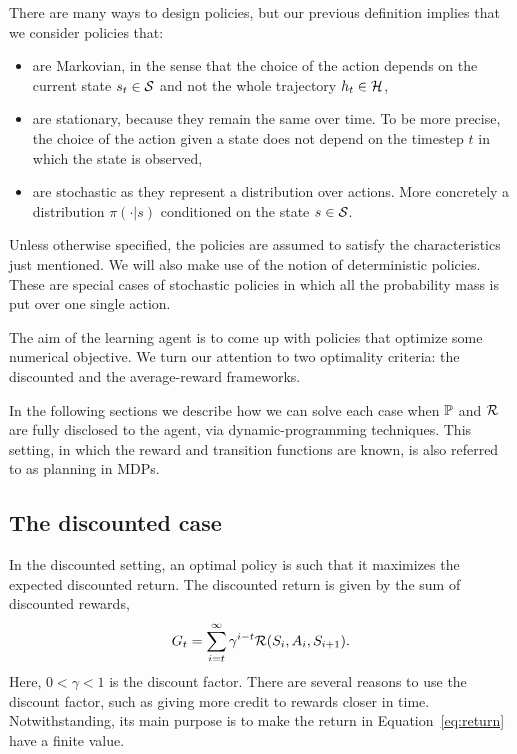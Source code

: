 There are many ways to design policies, but our previous definition implies that we consider policies that:
\begin{itemize}
  \item are Markovian, in the sense that the choice of the action depends on the current state $s_t\in\mathcal{S}$ and not the whole trajectory $h_t\in\mathcal{H}$, 
  \item are stationary, because they remain the same over time. To be more precise, the choice of the action given a state does not depend on the timestep $t$ in which the state is observed,
  \item are stochastic as they represent a distribution over actions. More concretely a distribution $\pi(\cdot\lvert s)$ conditioned on the state $s\in\mathcal{S}$. 
\end{itemize}
Unless otherwise specified, the policies are assumed to satisfy the characteristics just mentioned. We will also make use of the notion of deterministic policies. These are special cases of stochastic policies in which all the probability mass is put over one single action.

The aim of the learning agent is to come up with policies that optimize some numerical objective. We turn our attention to two optimality criteria: the discounted and the average-reward frameworks. 

In the following sections we describe how we can solve each case when $\mathbb{P}$ and $\mathcal{R}$ are fully disclosed to the agent, via dynamic-programming techniques. This setting, in which the reward and transition functions are known, is also referred to as planning in MDPs.

\subsection{The discounted case}
\label{sec:dp}
In the discounted setting, an optimal policy is such that it maximizes the expected discounted return. The discounted return is given by the sum of discounted rewards, 
\begin{equation}
  G_t = \sum_{i=t} ^\infty \gamma ^ {i-t} \mathcal{R}(S_i, A_i, S_{i+1}).
  \label{eq:return}
\end{equation}
Here, $0<\gamma<1$ is the discount factor. There are several reasons to use the discount factor, such as giving more credit to rewards closer in time. Notwithstanding, its main purpose is to make the return in Equation~\ref{eq:return} have a finite value.

